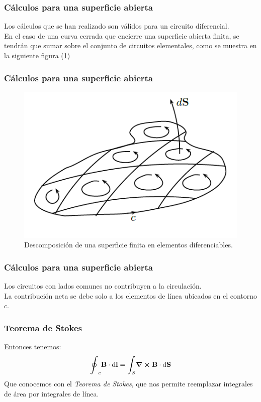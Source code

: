 \documentclass[12pt]{beamer}
\begin{document}
\begin{frame}
\frametitle{Cálculos para una superficie abierta}
Los cálculos que se han realizado son válidos para un circuito diferencial.
\\
\bigskip
\pause
En el caso de una curva cerrada que encierre una superficie abierta finita, se tendrán que sumar sobre el conjunto de circuitos elementales, como se muestra en la siguiente figura (\ref{fig:figura_superficie_elementos_diferenciables})
\end{frame}
\begin{frame}
\frametitle{Cálculos para una superficie abierta}
\begin{figure}[h!]
    \centering
    \includegraphics[scale=0.6]{Imagenes/Superficie_Elementos_Diferenciables.png}
    \caption{Descomposición de una superficie finita en elementos diferenciables.}
    \label{fig:figura_superficie_elementos_diferenciables}
\end{figure}
\end{frame}
\begin{frame}
\frametitle{Cálculos para una superficie abierta}
Los circuitos con lados comunes no contribuyen a la circulación.
\\
\bigskip
\pause
La contribución neta se debe solo a los elementos de línea ubicados en el contorno $c$.
\end{frame}
\begin{frame}
\frametitle{Teorema de Stokes}
Entonces tenemos:
\pause
\begin{align}
\scaleoint{6ex}_{c} \vb{B} \cdot \dd{\vb{l}} = \scaleint{6ex}_{\bs S} \curl{\vb{B}} \cdot \dd{\vb{S}}
\label{eq:ecuacion_01_35}
\end{align}
Que conocemos con el \emph{Teorema de Stokes}, que nos permite reemplazar integrales de área por integrales de línea.
\end{frame}
\end{document}
